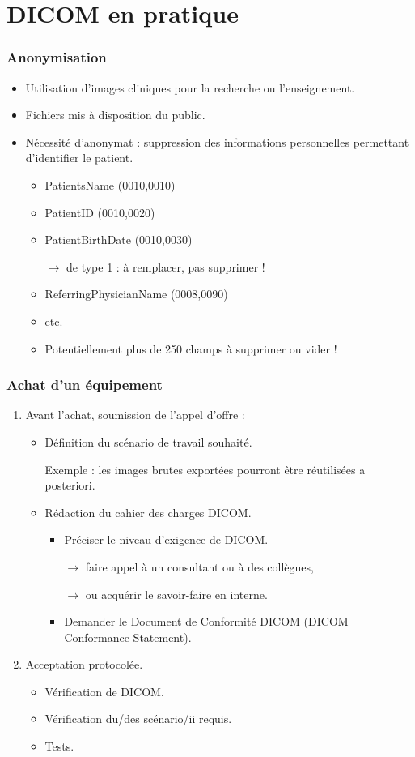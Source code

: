 \section{DICOM en pratique}

\frame
{
	\frametitle{Anonymisation}
	\begin{itemize}
		\item<1-> Utilisation d'images cliniques pour la recherche ou l'enseignement.
		\item<2-> Fichiers mis \`a disposition du public.
		\item<3-> N\'ecessit\'e d'anonymat : suppression des informations personnelles permettant d'identifier le patient.
		\begin{itemize}
			\item<4-> PatientsName (0010,0010)
			\item<5-> PatientID (0010,0020)
			\item<6-> PatientBirthDate (0010,0030)
			
			$\rightarrow$ de type 1 : \`a remplacer, pas supprimer !
			\item<7-> ReferringPhysicianName (0008,0090)
			\item<8-> etc.
			\item<9-> Potentiellement plus de 250 champs \`a supprimer ou vider !
		\end{itemize}
	\end{itemize}
}

\frame
{
	\frametitle{Achat d'un \'equipement}
	\begin{enumerate}
		\item<1-> Avant l'achat, soumission de l'appel d'offre :
		\begin{itemize}
			\item<2-> D\'efinition du sc\'enario de travail souhait\'e.
			
			Exemple : les images brutes export\'ees pourront \^etre r\'eutilis\'ees a posteriori.
			\item<3-> R\'edaction du cahier des charges DICOM.
			\begin{itemize}
				\item<4-> Pr\'eciser le niveau d'exigence de DICOM.
				
				$\rightarrow$ faire appel \`a un consultant ou \`a des coll\`egues,
				
				$\rightarrow$ ou acqu\'erir le savoir-faire en interne.
				\item<5-> Demander le Document de Conformit\'e DICOM (DICOM Conformance Statement).
			\end{itemize}
		\end{itemize}
		\item<6-> Acceptation protocol\'ee.
		\begin{itemize}
			\item<7-> V\'erification de DICOM.
			\item<8-> V\'erification du/des sc\'enario/ii requis.
			\item<9-> Tests.
		\end{itemize}
	\end{enumerate}
}

